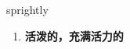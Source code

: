 
\begin{frame}
{\huge sprightly}
\begin{center}
\begin{enumerate}\Large
  \item \textbf{活泼的，充满活力的}
\end{enumerate}
\end{center}
\end{frame}
